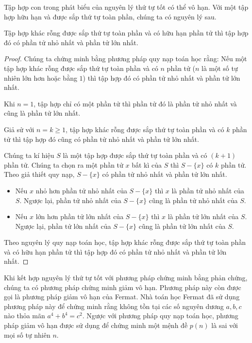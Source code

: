 Tập hợp con trong phát biểu của nguyên lý thứ tự tốt có thể vô hạn. Với một tập hợp hữu hạn và được sắp thứ tự toàn phần, chúng ta có nguyên lý sau.
\begin{theorem}
    Tập hợp khác rỗng được sắp thứ tự toàn phần và có hữu hạn phần tử thì tập hợp đó có phần tử nhỏ nhất và phần tử lớn nhất.
\end{theorem}

\begin{proof}
    Chúng ta chứng minh bằng phương pháp quy nạp toán học rằng: Nếu một tập hợp khác rỗng được sắp thứ tự toàn phần và có $n$ phần tử ($n$ là một số tự nhiên lớn hơn hoặc bằng $1$) thì tập hợp đó có phần tử nhỏ nhất và phần tử lớn nhất.

    Khi $n = 1$, tập hợp chỉ có một phần tử thì phần tử đó là phần tử nhỏ nhất và cũng là phần tử lớn nhất.

    Giả sử với $n = k\geq 1$, tập hợp khác rỗng được sắp thứ tự toàn phần và có $k$ phần tử thì tập hợp đó cũng có phần tử nhỏ nhất và phần tử lớn nhất.

    Chúng ta kí hiệu $S$ là một tập hợp được sắp thứ tự toàn phần và có $(k+1)$ phần tử. Chúng ta chọn ra một phần tử $x$ bất kì của $S$ thì $S - \{x\}$ có $k$ phần tử. Theo giả thiết quy nạp, $S - \{x\}$ có phần tử nhỏ nhất và phần tử lớn nhất.
    \begin{itemize}
        \item Nếu $x$ nhỏ hơn phần tử nhỏ nhất của $S - \{x\}$ thì $x$ là phần tử nhỏ nhất của $S$. Ngược lại, phần tử nhỏ nhất của $S - \{x\}$ cũng là phần tử nhỏ nhất của $S$.
        \item Nếu $x$ lớn hơn phần tử lớn nhất của $S - \{x\}$ thì $x$ là phần tử lớn nhất của $S$. Ngược lại, phần tử lớn nhất của $S - \{x\}$ cũng là phần tử lớn nhất của $S$.
    \end{itemize}

    Theo nguyên lý quy nạp toán học, tập hợp khác rỗng được sắp thứ tự toàn phần và có hữu hạn phần tử thì tập hợp đó có phần tử nhỏ nhất và phần tử lớn nhất.
\end{proof}

Khi kết hợp nguyên lý thứ tự tốt với phương pháp chứng minh bằng phản chứng, chúng ta có phương pháp chứng minh giảm vô hạn. Phương pháp này còn được gọi là phương pháp giảm vô hạn của Fermat. Nhà toán học Fermat đã sử dụng phương pháp này để chứng minh rằng không tồn tại các số nguyên dương $a, b, c$ nào thỏa mãn $a^{4} + b^{4} = c^{2}$. Ngược với phương pháp quy nạp toán học, phương pháp giảm vô hạn được sử dụng để chứng minh một mệnh đề $p(n)$ là sai với mọi số tự nhiên $n$.

